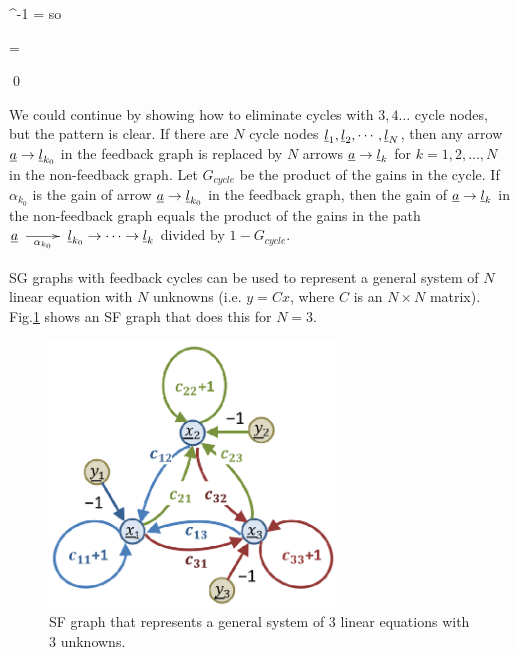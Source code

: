 \beq
\left[
\begin{array}{cc}
-1&\nu
\\
\mu&-1
\end{array}
\right]^{-1}
=
\left[
\begin{array}{cc}
-1&-\nu
\\
-\mu&-1
\end{array}
\right]
\eeq
so

\beq
{}
=
\left[
\begin{array}{cc}
1&\nu
\\
\mu&1
\end{array}
\right]
\eeq

\qed

We could continue by showing
how to eliminate cycles
with $3, 4\ldots$ cycle nodes,
but
the pattern is clear.
If there are $N$
cycle nodes ${\underline{l}}_1, {\underline{l}}_2,\cdots, {\underline{l}}_N$,
then
any arrow ${\underline{a}}\rightarrow {\underline{l}}_{k_0}$
in the feedback graph
is replaced by $N$ arrows
${\underline{a}}\rightarrow {\underline{l}}_k$
for $k=1,2, \ldots,N$
in the non-feedback graph.
Let $G_{cycle}$
be the product
of the gains in the cycle.
If $\alpha_{k_0}$
is the gain of arrow
${\underline{a}}\rightarrow{\underline{l}}_{k_0}$
in the feedback graph,
then the gain of ${\underline{a}}\rightarrow{\underline{l}}_k$
in the non-feedback graph equals
the product of the gains
in the path  $\rva\maparrow{\alpha_{k_0}}\rvl_{k_0}\rarrow\cdots\rarrow\rvl_k$
divided by $1-G_{cycle}$.


SG graphs 
with feedback cycles can be
used to represent a general
system of $N$ linear equation
with $N$ unknowns (i.e. $y=Cx$,
where $C$ is
an $N\times N$ matrix).
Fig.\ref{fig-flow-graph-3eqs}
shows an SF graph that
does this for $N=3$.


\begin{figure}[h!]
\centering
\includegraphics[width=3in]
{control-th/flow_graph_3eqs.png}
\caption{SF graph
that represents a general
system of 3 linear equations 
with 3 unknowns.}
\label{fig-flow-graph-3eqs}
\end{figure}


